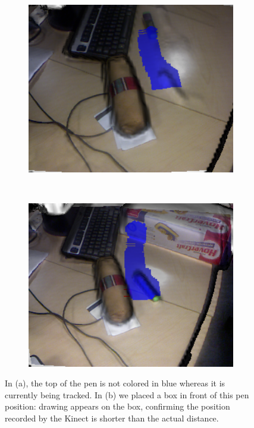 \documentclass[12pt, twoside]{article}
\begin{document}
\begin{figure}[h]
  \centering
  \begin{subfigure}[t]{0.5\textwidth}
    \includegraphics[width=1\textwidth]{PenIssue1.png}
    \caption{}
  \end{subfigure}~
  \begin{subfigure}[t]{0.5\textwidth}
    \includegraphics[width=1\textwidth]{PenIssue2.png}
    \caption{}
    \end{subfigure}
  \caption{\label{fig:penissue}In (a), the top of the pen is not colored in blue whereas it is currently being tracked. In (b) we placed a box in front of this pen position: drawing appears on the box, confirming the position recorded by the Kinect is shorter than the actual distance.}
  
\end{figure}
\end{document}
